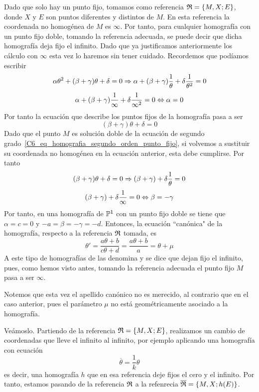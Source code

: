 Dado que solo hay un punto fijo, tomamos como referencia $\mathfrak{R}=\{M,X;E\}$, donde $X$ y $E$ son puntos diferentes y distintos de $M$. En esta referencia la coordenada no homogénea de $M$ es $\infty$. Por tanto, para cualquier homografía con un punto fijo doble, tomando la referencia adecuada, se puede decir que dicha homografía deja fijo el infinito. Dado que ya justificamos anteriormente los cálculo con $\infty$ esta vez lo haremos sin tener cuidado. Recordemos que podíamos escribir
\begin{equation*}
	\alpha\theta^2+(\beta+\gamma)\theta+\delta=0\Rightarrow\alpha+(\beta+\gamma)\frac{1}{\theta}+\delta\frac{1}{\theta^2}=0
\end{equation*}
\begin{equation*}
	\alpha+(\beta+\gamma)\frac{1}{\infty}+\delta\frac{1}{\infty^2}=0\Leftrightarrow \alpha=0
\end{equation*}
Por tanto la ecuación que describe los puntos fijos de la homografía pasa a ser
\begin{equation*}
	(\beta+\gamma)\theta+\delta=0
\end{equation*}
Dado que el punto $M$ es solución doble de la ecuación de segundo grado~\eqref{C6_eq_homografia_segundo_orden_punto_fijo}, si volvemos a sustituir su coordenada no homogénea en la ecuación anterior, esta debe cumplirse. Por tanto
\begin{equation*}
	(\beta+\gamma)\theta+\delta=0\Rightarrow(\beta+\gamma)+\delta\frac{1}{\theta}=0
\end{equation*}
\begin{equation*}
	(\beta+\gamma)+\delta\frac{1}{\infty}=0\Leftrightarrow \beta=-\gamma
\end{equation*}
Por tanto, en una homografía de $\mathbb{P}^1$ con un punto fijo doble se tiene que $\alpha=c=0$ y $-a=\beta=-\gamma=-d$. Entonces, la ecuación ``canónica" de la homografía, respecto a la referencia $\mathfrak{R}$ tomada, es
\begin{equation}
\theta'=\frac{a\theta+b}{c\theta +d}=\frac{a\theta+b}{a}=\theta+\mu
\end{equation}
A este tipo de homografías de las denomina  y se dice que dejan fijo el infinito, pues, como hemos visto antes, tomando la referencia adecuada el punto fijo $M$ pasa a ser $\infty$.

Notemos que esta vez el apellido canónico no es merecido, al contrario que en el caso anterior, pues el parámetro $\mu$ no está geométricamente asociado a la homografía. 

Veámoslo. Partiendo de la referencia $\mathfrak{R}=\{M,X;E\}$, realizamos un cambio de coordenadas que lleve el infinito al infinito, por ejemplo aplicando una homografía con ecuación
\begin{equation*}
	\overline{\theta}=\frac{1}{k}\theta
\end{equation*}
es decir, una homografía $h$ que en esa referencia deje fijos el cero y el infinito. Por tanto, estamos pasando de la referencia $\mathfrak{R}$ a la refenrecia $\overline{\mathfrak{R}}=\{M,X;h(E)\}$. 

